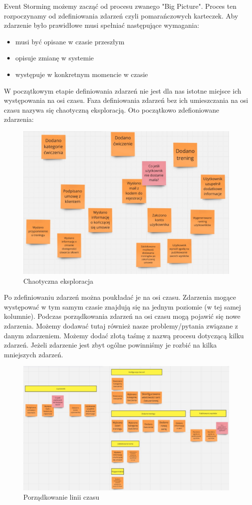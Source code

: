 \documentclass{article}
\begin{document}
      Event Storming możemy zacząć od procesu zwanego "Big Picture". Proces ten rozpoczynamy od zdefiniowania zdarzeń czyli pomarańczowych karteczek. Aby zdarzenie było prawidłowe musi spełniać następujące wymagania:
      \begin{itemize}
            \item musi być opisane w czasie przeszłym
            \item opisuje zmianę w systemie
            \item występuje w konkretnym momencie w czasie
      \end{itemize}
      W początkowym etapie definiowania zdarzeń nie jest dla nas istotne miejsce ich występowania na osi czasu. Faza definiowania zdarzeń bez ich umieszczania na osi czasu nazywa się chaotyczną eksploracją. Oto początkowo zdefioniowane zdarzenia:
      \begin{figure}[h]
            \centering
            \includegraphics[width=0.9\linewidth]{bigPicture1.jpg}
            \caption{Chaotyczna eksploracja}
      \end{figure}
      Po zdefiniowaniu zdarzeń można poukładać je na osi czasu. Zdarzenia mogące występować w tym samym czasie znajdują się na jednym poziomie (w tej samej kolumnie). Podczas porządkowania zdarzeń na osi czasu mogą pojawić się nowe zdarzenia. Możemy dodawać tutaj również nasze problemy/pytania związane z danym zdarzeniem. Możemy dodać złotą taśmę z nazwą procesu dotyczącą kilku zdarzeń. Jeżeli zdarzenie jest zbyt ogólne powinniśmy je rozbić na kilka mniejszych zdarzeń.
      \begin{figure}[h]
            \centering
            \includegraphics[width=0.9\linewidth]{bigPicture3.jpg}
            \caption{Porządkowanie linii czasu}
      \end{figure}
\end{document}
